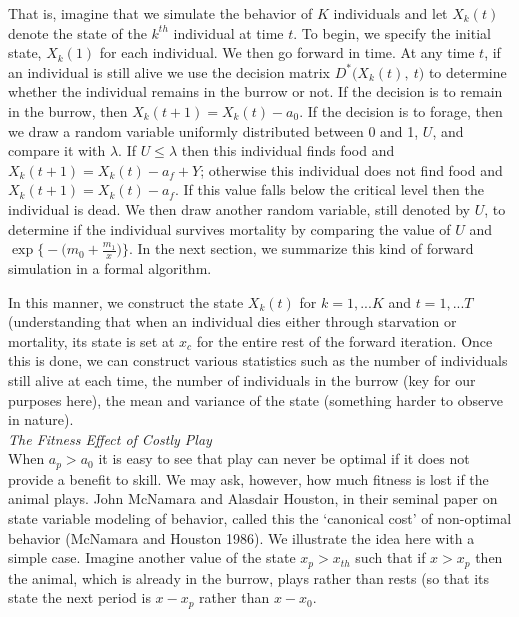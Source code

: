 \documentclass[12pt, letterpaper, fleqn]{article}
\begin{document}
	
	That is, imagine that we simulate the behavior of $K$ individuals and let $X_k(t)$ denote the state of the $k^{th}$ individual at time $t$.  
	To begin, we specify the initial state, $X_k(1)$ for each individual. 
	We then go forward in time. At any time $t$, if an individual is still alive we use the decision matrix $D^*\big(X_k(t),~t\big)$ to determine whether the individual remains in the burrow or not.  
	If the decision is to remain in the burrow, then \mbox{$X_k(t+1)=X_k(t)-a_0$.}  
	If the decision is to forage, then we draw a  random variable uniformly distributed between 0 and 1, $U$, and compare it with $\lambda$.  
	If $U \le \lambda$ then this individual finds food and $X_k(t+1)=X_k(t)-a_f+Y$; otherwise this individual does not find food and $X_k(t+1)=X_k(t)-a_f$. 
	If this value falls below the critical level then the individual is dead. We then draw another random variable, still denoted by $U$, to determine if the individual survives mortality by comparing the value of $U$ and $\exp\Big\{-\big(m_0+\frac{m_1}{x}\big)\Big\}$.  
	In the next section, we summarize this kind of forward simulation in a formal algorithm.
	
	
	In this manner, we construct the state $X_k(t)$ for $k=1, ...K$ and $t=1,...T$ (understanding that when an individual dies either through starvation or mortality, its state is set at $x_c$ for the entire rest of the forward iteration.  
	Once this is done, we can construct various statistics such as the number of individuals still alive at each time, the number of individuals in the burrow {\color{red}(key for our purposes here)}, the mean and variance of the state (something harder to observe in nature).\\
	
	
	\noindent\textit{The Fitness Effect of Costly Play}\\
	When $a_p>a_0$ it is easy to see that play can never be optimal if it does not provide a benefit to skill. 
	We may ask, however, how much fitness is lost if the animal plays.  
	John McNamara and Alasdair Houston, in their seminal paper on state variable modeling of behavior, called this the `canonical cost' of non-optimal behavior (McNamara and Houston 1986). 
	We illustrate the idea here with a simple case.
	Imagine another value of the state $x_p>x_{th}$ such that if $x>x_p$ then the animal, which is already in the burrow, plays rather than rests (so that its state the next period is $x-x_p$ rather than $x-x_0$.
	
\end{document}
